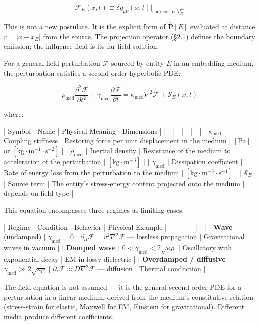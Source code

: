 \documentclass[11pt,a4paper]{article}
\theoremstyle{definition}
\theoremstyle{remark}
\begin{document}
\begin{equation}
\mathcal{F}_E(x, t) \equiv \delta g_{\mu\nu}(x, t) \Big|_{\text{sourced by } T^{\mu\nu}_E}
\end{equation}


This is not a new postulate. It is the explicit form of $\hat{\mathbf{P}}[E]$ evaluated at distance $r = |x - x_E|$ from the source. The projection operator (\S 2.1) defines the boundary emission; the influence field is its far-field solution.

For a general field perturbation $\mathcal{F}$ sourced by entity $E$ in an embedding medium, the perturbation satisfies a second-order hyperbolic PDE:


\begin{equation}
\boxed{\rho_{\text{med}} \frac{\partial^2 \mathcal{F}}{\partial t^2} + \gamma_{\text{med}} \frac{\partial \mathcal{F}}{\partial t} = \kappa_{\text{med}} \nabla^2 \mathcal{F} + \mathcal{S}_E(x, t)}
\end{equation}


where:

| Symbol | Name | Physical Meaning | Dimensions |
|---|---|---|---|
| $\kappa_{\text{med}}$ | Coupling stiffness | Restoring force per unit displacement in the medium | $[\text{Pa}]$ or $[\text{kg} \cdot \text{m}^{-1} \cdot \text{s}^{-2}]$ |
| $\rho_{\text{med}}$ | Inertial density | Resistance of the medium to acceleration of the perturbation | $[\text{kg} \cdot \text{m}^{-3}]$ |
| $\gamma_{\text{med}}$ | Dissipation coefficient | Rate of energy loss from the perturbation to the medium | $[\text{kg} \cdot \text{m}^{-3} \cdot \text{s}^{-1}]$ |
| $\mathcal{S}_E$ | Source term | The entity's stress-energy content projected onto the medium | depends on field type |

This equation encompasses three regimes as limiting cases:

| Regime | Condition | Behavior | Physical Example |
|---|---|---|---|
| \textbf{Wave} (undamped) | $\gamma_{\text{med}} = 0$ | $\partial_{tt}\mathcal{F} = v^2 \nabla^2 \mathcal{F}$ — lossless propagation | Gravitational waves in vacuum |
| \textbf{Damped wave} | $0 < \gamma_{\text{med}} < 2\sqrt{\kappa \rho}$ | Oscillatory with exponential decay | EM in lossy dielectric |
| \textbf{Overdamped / diffusive} | $\gamma_{\text{med}} \gg 2\sqrt{\kappa \rho}$ | $\partial_t \mathcal{F} \approx D \nabla^2 \mathcal{F}$ — diffusion | Thermal conduction |

The field equation is not assumed — it is the general second-order PDE for a perturbation in a linear medium, derived from the medium's constitutive relation (stress-strain for elastic, Maxwell for EM, Einstein for gravitational). Different media produce different coefficients.
\end{document}
